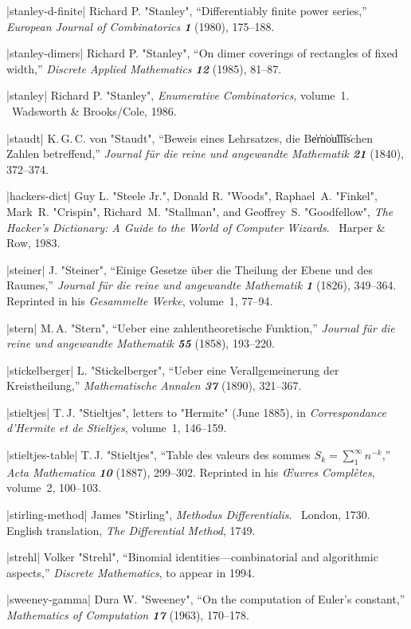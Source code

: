 \bib|stanley-d-finite|%
Richard P. "Stanley", ``Differentiably finite power series,''
{\sl European Journal of Combinatorics\/ \bf1} (1980), 175--188.

\bib|stanley-dimers|%
Richard P. "Stanley", ``On dimer coverings of rectangles of fixed width,''
{\sl Discrete Applied Mathematics\/ \bf12} (1985), 81--87.

\bib|stanley|%
Richard P. "Stanley", {\sl Enumerative Combinatorics}, volume~1. \
Wadsworth \& Brooks/Cole, 1986.

\bib|staudt|%
K.\,G.\,C. von "Staudt", ``Beweis eines Lehrsatzes, die
B\|e\|r\|n\|o\|u\|l\|l\|i\|schen Zahlen betreffend,''
{\sl Journal f\"ur die reine und angewandte Mathematik\/ \bf21}
(1840), 372--374.

\bib|hackers-dict|%
Guy L. "Steele Jr.", Donald R. "Woods", Raphael~A. "Finkel",
Mark~R. "Crispin", Richard~M. "Stallman", and Geoffrey~S. "Goodfellow",
{\sl The Hacker's Dictionary: A Guide to the World of Computer
Wizards}. \ Harper \& Row, 1983.

\bib|steiner|%
J. "Steiner", ``Einige Gesetze \"uber die Theilung der Ebene und des Raumes,''
{\sl Journal f\"ur die reine und angewandte Mathematik\/ \bf1} (1826), 349--364.
Reprinted in his {\sl Gesammelte Werke}, volume~1, 77--94.

\bib|stern|%
M.\,A. "Stern", ``Ueber eine zahlentheoretische Funktion,''
{\sl Journal f\"ur die reine und angewandte Mathematik\/ \bf55} (1858), 193--220.

\bib|stickelberger|%
L. "Stickelberger", ``Ueber eine Verallgemeinerung der Kreis\-theilung,''
{\sl Mathematische Annalen\/ \bf37} (1890), 321--367.

\bib|stieltjes|%
T.\,J. "Stieltjes", letters to "Hermite" (June 1885), in
{\sl Correspondance d'Her\-mite et de Stieltjes}, volume~1, 146--159.

\bib|stieltjes-table|%
T.\,J. "Stieltjes", ``Table des valeurs des sommes $S_k=
\sum_1^\infty n^{-k}$,'' {\sl Acta Mathematica\/ \bf10} (1887), 299--302.
Reprinted in his {\sl \OE uvres Compl\`etes}, volume~2, 100--103.

\bib|stirling-method|%
James "Stirling", {\sl Methodus Differentialis}. \ London, 1730. English
translation, {\sl The Differential Method}, 1749.

\bib|strehl|%
Volker "Strehl", ``Binomial identities\dash---combinatorial and algorithmic
aspects,'' {\sl Discrete Mathematics}, to appear in 1994.

\bib|sweeney-gamma|%
Dura W. "Sweeney", ``On the computation of Euler's constant,''
{\sl Mathematics of Computation\/ \bf17} (1963), 170--178.

